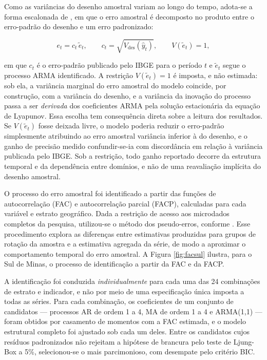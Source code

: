 \documentclass[rbe,wwwview]{econbr}
\begin{document}
Como as variâncias do desenho amostral variam ao longo do tempo, adota-se a forma escalonada de \citet{binderdick1989}, em que o erro amostral é decomposto no produto entre o erro-padrão do desenho e um erro padronizado:

\vspace{-0.5cm}
\begin{equation}
    e_t = c_t\,\tilde{e}_t,
    \qquad c_t = \sqrt{V_{\text{des}}(\hat{y}_t)},
    \qquad V(\tilde{e}_t) = 1,
    \label{eq:erro_escalonado}
\end{equation}

\noindent
em que \(c_t\) é o erro-padrão publicado pelo IBGE para o período \(t\) e \(\tilde{e}_t\) segue o processo ARMA identificado. A restrição \(V(\tilde{e}_t)=1\) é imposta, e não estimada: sob ela, a variância marginal do erro amostral do modelo coincide, por construção, com a variância do desenho, e a variância da inovação do processo passa a ser \textit{derivada} dos coeficientes ARMA pela solução estacionária da equação de Lyapunov. Essa escolha tem consequência direta sobre a leitura dos resultados. Se \(V(\tilde{e}_t)\) fosse deixada livre, o modelo poderia reduzir o erro-padrão simplesmente atribuindo ao erro amostral variância inferior à do desenho, e o ganho de precisão medido confundir-se-ia com discordância em relação à variância publicada pelo IBGE. Sob a restrição, todo ganho reportado decorre da estrutura temporal e da dependência entre domínios, e não de uma reavaliação implícita do desenho amostral.

O processo do erro amostral foi identificado a partir das funções de autocorrelação (FAC) e autocorrelação parcial (FACP), calculadas para cada variável e estrato geográfico. Dada a restrição de acesso aos microdados completos da pesquisa, utilizou-se o método dos pseudo-erros, conforme \citet{silva2002}. Esse procedimento explora as diferenças entre estimativas produzidas para grupos de rotação da amostra e a estimativa agregada da série, de modo a aproximar o comportamento temporal do erro amostral. A Figura \ref{fig:facsul} ilustra, para o Sul de Minas, o processo de identificação a partir da FAC e da FACP.

A identificação foi conduzida \textit{individualmente} para cada uma das 24 combinações de estrato e indicador, e não por meio de uma especificação única imposta a todas as séries. Para cada combinação, os coeficientes de um conjunto de candidatos --- processos AR de ordem 1 a 4, MA de ordem 1 a 4 e ARMA(1,1) --- foram obtidos por casamento de momentos com a FAC estimada, e o modelo estrutural completo foi ajustado sob cada um deles. Entre os candidatos cujos resíduos padronizados não rejeitam a hipótese de brancura pelo teste de Ljung-Box a 5\%, selecionou-se o mais parcimonioso, com desempate pelo critério BIC.
\end{document}
